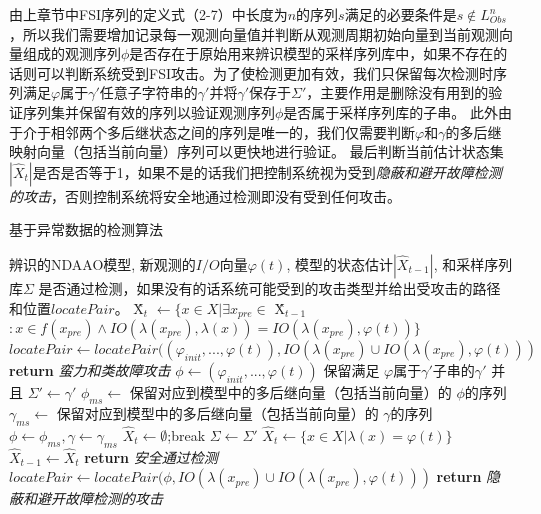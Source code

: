 由上章节中FSI序列的定义式（2-7）中长度为$n$的序列$s$满足的必要条件是$s\notin L_{Obs}^n$，所以我们需要增加记录每一观测向量值并判断从观测周期初始向量到当前观测向量组成的观测序列$\phi$是否存在于原始用来辨识模型的采样序列库中，如果不存在的话则可以判断系统受到FSI攻击。为了使检测更加有效，我们只保留每次检测时序列满足$ \varphi$属于$\gamma'$任意子字符串的$\gamma'$并将$\gamma'$保存于$\varSigma'$，主要作用是删除没有用到的验证序列集并保留有效的序列以验证观测序列$\phi$是否属于采样序列库的子串。 此外由于介于相邻两个多后继状态之间的序列是唯一的，我们仅需要判断$ \varphi $和$ \gamma $的多后继映射向量（包括当前向量）序列可以更快地进行验证。 最后判断当前估计状态集$|\hat{X}_{t}|$是否是否等于1，如果不是的话我们把控制系统视为受到\textit {隐蔽和避开故障检测的攻击}，否则控制系统将安全地通过检测即没有受到任何攻击。

\begin{algorithm}[!htp]
		\caption{基于异常数据的检测算法}
		\label{algo:abd}
		\begin{algorithmic}[1]
			\Require %
			辨识的NDAAO模型, 新观测的$I/O$向量$\varphi(t)$, 模型的状态估计$|\hat{X}_{t-1}|$, 和采样序列库$\varSigma$
			\Ensure %
			是否通过检测，如果没有的话系统可能受到的攻击类型并给出受攻击的路径和位置$locatePair$。
			\State \^{X}$_{t}$ $\leftarrow \{x\in X|\exists x_{pre}\in$ \^{X}$_{t-1}$$:x\in f(x_{pre}) \wedge IO(\lambda(x_{pre}),\lambda(x))=IO(\lambda(x_{pre}),\varphi(t))\}$
			\State $locatePair\leftarrow locatePair((\varphi_{init},...,\varphi(t)),IO(\lambda(x_{pre})\cup IO(\lambda(x_{pre}),\varphi(t)))$
			\State \textbf{return} \textit{蛮力和类故障攻击}
			\EndIf
			\State $\phi \leftarrow (\varphi_{init},...,\varphi(t))$
			\State 保留满足 $\varphi 属于\gamma'$子串的$\gamma'$ 并且 $\varSigma' \leftarrow \gamma'$
			\State $\phi_{ms} \leftarrow$ 保留对应到模型中的多后继向量（包括当前向量）的 $\phi$的序列
			\State $\gamma_{ms} \leftarrow$ 保留对应到模型中的多后继向量（包括当前向量）的 $\gamma$的序列
			\State $\phi\leftarrow \phi_{ms}, \gamma\leftarrow \gamma_{ms}$
			\State $\hat{X}_t \leftarrow \emptyset$;\State break
			\EndIf
			\EndFor
			$\varSigma \leftarrow \varSigma'$
			\EndIf
			\Else
			\State $\hat{X}_t \leftarrow \{x\in X|\lambda(x)=\varphi(t)\}$
			\EndIf
			$\hat{X}_{t-1}\leftarrow \hat{X}_t$
			\State \textbf{return} \textit{安全通过检测}
			\Else
			\State $locatePair\leftarrow locatePair(\phi,IO(\lambda(x_{pre})\cup
			IO(\lambda(x_{pre}),\varphi(t)))$
			\State \textbf{return} \textit{隐蔽和避开故障检测的攻击}
			\EndIf
		\end{algorithmic}
	\end{algorithm}

